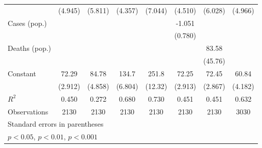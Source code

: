 \documentclass{article}
\begin{document}
{\begin{longtable}{l*{7}{c}}
                &  (4.945)         &  (5.811)         &  (4.357)         &  (7.044)         &  (4.510)         &  (6.028)         &  (4.966)         \\
Cases (pop.)    &                  &                  &                  &                  &   -1.051         &                  &                  \\
                &                  &                  &                  &                  &  (0.780)         &                  &                  \\
Deaths (pop.)   &                  &                  &                  &                  &                  &    83.58         &                  \\
                &                  &                  &                  &                  &                  &  (45.76)         &                  \\
Constant        &    72.29\sym{***}&    84.78\sym{***}&    134.7\sym{***}&    251.8\sym{***}&    72.25\sym{***}&    72.45\sym{***}&    60.84\sym{***}\\
                &  (2.912)         &  (4.858)         &  (6.804)         &  (12.32)         &  (2.913)         &  (2.867)         &  (4.182)         \\
\hline
\(R^{2}\)       &    0.450         &    0.272         &    0.680         &    0.730         &    0.451         &    0.451         &    0.632         \\
Observations    &     2130         &     2130         &     2130         &     2130         &     2130         &     2130         &     3030         \\
\hline\hline
\multicolumn{8}{l}{\footnotesize Standard errors in parentheses}\\
\multicolumn{8}{l}{\footnotesize \sym{*} \(p<0.05\), \sym{**} \(p<0.01\), \sym{***} \(p<0.001\)}\\
\end{longtable}
}
\end{document}
